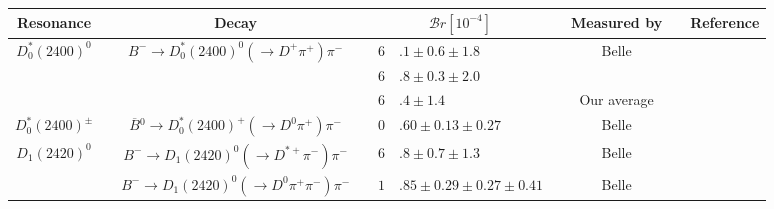\begin{adjustbox}{width=\textwidth,center}
{\setlength\tabcolsep{0pt}
	\begin{tabular}{cp{5pt}cp{5pt}r@{}lp{5pt}cp{5pt}c}
		\toprule
		\rowcolor{Gray} Resonance&&Decay &&\multicolumn{2}{c}{$\mathcal{B}r[10^{-4}]$} & & \multicolumn{1}{c}{Measured by} &&  \multicolumn{1}{c}{Reference}
		\\ \midrule
		\multirow{3}{*}{$D_{0}^{*}(2400)^{0}$}       &   & \multirow{3}{*}{$B^{-}\to D_{0}^{*}(2400)^{0}(\to D^{+}\pi^{+})\pi^{-}$}                 &                       & $6$                                  & $.1\pm0.6\pm1.8$                                &                       & Belle                         &                       & \cite{Abe:2003zm}    \\ 
		                                             &   &                                                                                          &                       & $6$                                  & $.8\pm0.3\pm2.0$                                &                       & \babar{}                      &                       & \cite{Aubert:2009wg} \\  \cmidrule{4-9}
		                                             &   &                                                                                          & \cellcolor{Gray}      & \cellcolor{Gray}$6$                  & \cellcolor{Gray}$.4\pm 1.4$                     & \cellcolor{Gray}      & \cellcolor{Gray}  Our average & \cellcolor{Gray}      &                      \\ \midrule
		\multirow{1}{*}{$D_{0}^{*}(2400)^{\pm}$}     &   & \multirow{1}{*}{$\overline{B}{}^{0}\to D_{0}^{*}(2400)^{+}(\to D^{0}\pi^{+})\pi^{-}$}    & \cellcolor{LightGray} & \cellcolor{LightGray} $0$            & \cellcolor{LightGray}$.60\pm0.13\pm0.27$        & \cellcolor{LightGray} & \cellcolor{LightGray} Belle   & \cellcolor{LightGray} & \cite{Kuzmin:2006mw} \\	\midrule		
		\multirow{2}{*}{$D_{1}^{}(2420)^{0}$}        &   & \multirow{1}{*}{$B^{-}\to D_{1}^{}(2420)^{0}(\to D^{*+}\pi^{-})\pi^{-}$}                 & \cellcolor{LightGray} & \cellcolor{LightGray} $6$            & \cellcolor{LightGray}$.8\pm0.7\pm1.3$           & \cellcolor{LightGray} & \cellcolor{LightGray} Belle   & \cellcolor{LightGray} & \cite{Abe:2003zm}    \\	\cmidrule{4-9}
		                                             &   & \multirow{1}{*}{$B^{-}\to D_{1}^{}(2420)^{0}(\to D^{0}\pi^{+}\pi^{-})\pi^{-}$}           & \cellcolor{LightGray} & \cellcolor{LightGray} $1$            & \cellcolor{LightGray}$.85\pm0.29\pm0.27\pm0.41$ & \cellcolor{LightGray} & \cellcolor{LightGray} Belle   & \cellcolor{LightGray} & \cite{Abe:2004sm}    \\	\midrule					

\end{tabular}}
\end{adjustbox}

